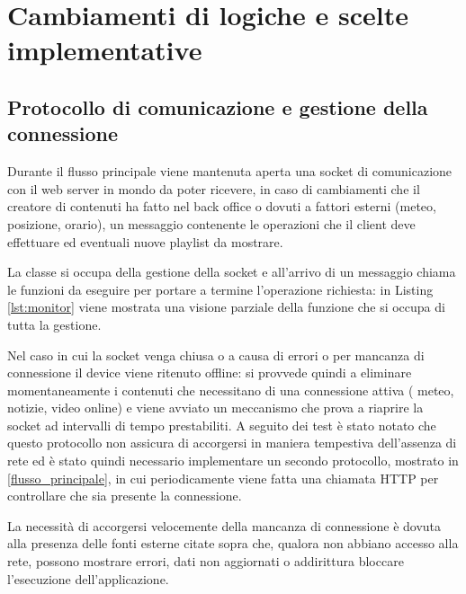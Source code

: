 

\section{Cambiamenti di logiche e scelte implementative}

\subsection{Protocollo di comunicazione e gestione della connessione}\label{connection}

Durante il flusso principale viene mantenuta aperta una socket di comunicazione con il web server in mondo da poter ricevere, in caso di cambiamenti che il creatore di contenuti ha fatto nel back office o dovuti a fattori esterni (meteo, posizione, orario), un messaggio contenente le operazioni che il client deve effettuare ed eventuali nuove playlist da mostrare. 

La classe  si occupa della gestione della socket e all'arrivo di un messaggio chiama le funzioni da eseguire per portare a termine l'operazione richiesta: in Listing \ref*{lst:monitor} viene mostrata una visione parziale della funzione  che si occupa di tutta la gestione.



Nel caso in cui la socket venga chiusa o a causa di errori o per mancanza di connessione il device viene ritenuto offline: si provvede quindi a eliminare momentaneamente i contenuti che necessitano di una connessione attiva ( meteo, notizie, video online) e viene avviato un meccanismo che prova a riaprire la socket ad intervalli di tempo prestabiliti.
A seguito dei test è stato notato che questo protocollo non assicura di accorgersi in maniera tempestiva dell'assenza di rete ed è stato quindi necessario implementare un secondo protocollo, mostrato in \ref*{flusso_principale}, in cui periodicamente viene fatta una chiamata HTTP per controllare che sia presente la connessione.

La necessità di accorgersi velocemente della mancanza di connessione è dovuta alla presenza delle fonti esterne citate sopra che, qualora non abbiano accesso alla rete, possono mostrare errori, dati non aggiornati o addirittura bloccare l'esecuzione dell'applicazione.

